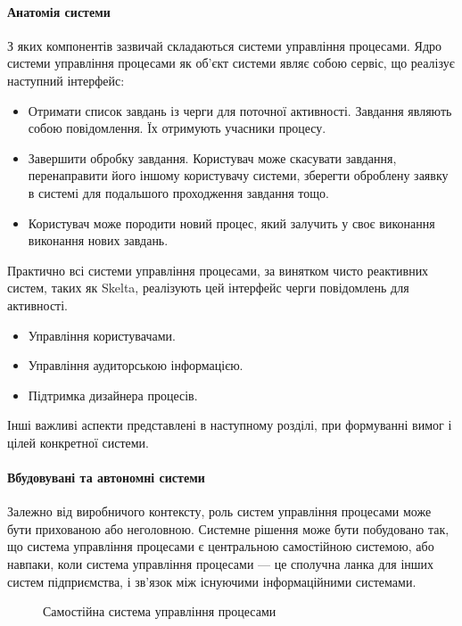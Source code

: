\documentclass{memoir}
\begin{document}
\paragraph{Анатомія системи}

З яких компонентів зазвичай складаються системи управління процесами. Ядро системи управління процесами як об’єкт системи являє собою сервіс, що реалізує наступний інтерфейс:

\begin{itemize}
    \item Отримати список завдань із черги для поточної активності. Завдання являють собою повідомлення. Їх отримують учасники процесу.
    \item Завершити обробку завдання. Користувач може скасувати завдання, перенаправити його іншому користувачу системи, зберегти оброблену заявку в системі для подальшого проходження завдання тощо.
    \item Користувач може породити новий процес, який залучить у своє виконання виконання нових завдань.
\end{itemize}

Практично всі системи управління процесами, за винятком чисто реактивних систем, таких як Skelta, реалізують цей інтерфейс черги повідомлень для активності.

\begin{itemize}
    \item Управління користувачами.
    \item Управління аудиторською інформацією.
    \item Підтримка дизайнера процесів.
\end{itemize}

Інші важливі аспекти представлені в наступному розділі, при формуванні вимог і цілей конкретної системи.

\paragraph{Вбудовувані та автономні системи}

Залежно від виробничого контексту, роль систем управління процесами може бути прихованою або неголовною. Системне рішення може бути побудовано так, що система управління процесами є центральною самостійною системою, або навпаки, коли система управління процесами — це сполучна ланка для інших систем підприємства, і зв’язок між існуючими інформаційними системами.

\begin{figure}[h]
    \centering
    \caption{Самостійна система управління процесами}
    \label{fig:standalone_wf}
\end{figure}
\end{document}
